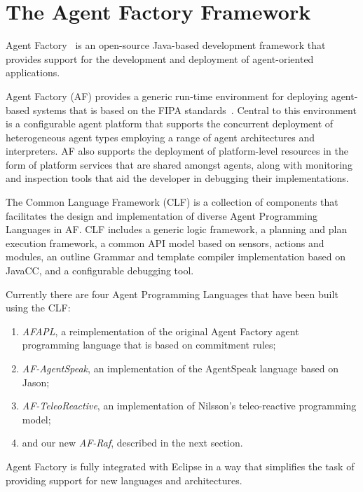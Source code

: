 \documentclass[preprint]{sigplanconf} %
\begin{document}
\section{The Agent Factory Framework} \label{sec:af} %

Agent Factory~\cite{collier2002agent} is an open-source Java-based
development framework that provides support for the development and
deployment of agent-oriented applications.

Agent Factory (AF) provides a generic run-time environment for deploying
agent-based systems that is based on the FIPA standards~\cite{poslad2000fipa}.
Central to this environment is a configurable agent platform that supports the
concurrent deployment of heterogeneous agent types employing a range of agent
architectures and interpreters. AF also supports the deployment of
platform-level resources in the form of platform services that are shared
amongst agents, along with monitoring and inspection tools that aid the
developer in debugging their implementations. 

The Common Language Framework (CLF) is a collection of components that
facilitates the design and implementation of diverse Agent Programming
Languages in AF. CLF includes a generic logic framework, a planning and
plan execution framework, a common API model based on sensors, actions and
modules, an outline Grammar and template compiler implementation based on
JavaCC, and a configurable debugging tool.

Currently there are four Agent Programming Languages that have been built
using the CLF: 
\begin{enumerate}

\item \textit{AFAPL}, a reimplementation of the original Agent Factory
agent programming language that is based on commitment rules;

\item \textit{AF-AgentSpeak}, an implementation of the AgentSpeak language based on Jason;

\item \textit{AF-TeleoReactive}, an implementation of Nilsson's teleo-reactive
programming model; 

\item and our new \textit{AF-Raf}, described in the next section.
\end{enumerate}

Agent Factory is fully integrated with Eclipse in a way that simplifies
the task of providing support for new languages and architectures.
\end{document}
